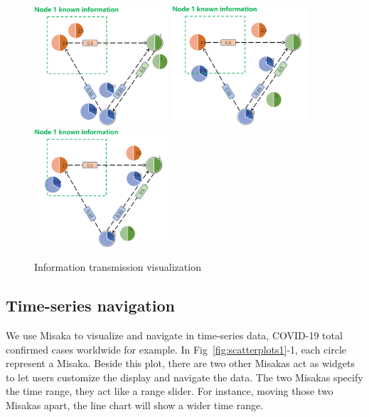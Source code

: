 \documentclass[conference]{IEEEtran}
\begin{document}
\begin{figure}[ht]
    \centering
    \includegraphics[width=5cm]{PPT1.png}
    \includegraphics[width=5cm]{PPT2.png}
    \includegraphics[width=5cm]{PPT3.png}
    \caption{Information transmission visualization}
\label{fig:PPT}
\end{figure}

\subsection{Time-series navigation}

We use Misaka to visualize and navigate in time-series data, COVID-19 total confirmed cases worldwide for example. In Fig~\ref{fig:scatterplots1}-1, each circle represent a Misaka. Beside this plot, there are two other Misakas act as widgets to let users customize the display and navigate the data. The two Misakas specify the time range, they act like a range slider\cite{ahlberg1992dynamic}. For instance, moving those two Misakas apart, the line chart will show a wider time range.

\end{document}
